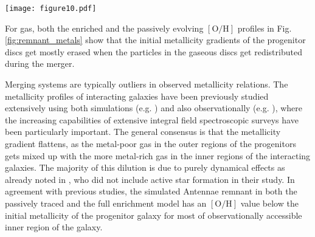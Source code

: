 \documentclass[a4paper,fleqn,usenatbib]{mnras}
\begin{document}
\begin{figure*}
\texttt{[image: figure10.pdf]}
    \caption{Gaseous (left) and stellar (right) oxygen abundance of the $1$ Gyr old remnant (black) compared to the
    passively evolved metallicity obtained from the initial conditions (dashed blue, see text for details) and
    the initial abundance of the NGC 4038 progenitor (red). The observed solar 
    abundances are also shown for reference.}
    \label{fig:remnant_metals}
\end{figure*}


For gas, both the enriched and the passively evolving $[\mathrm{O}/\mathrm{H}]$ profiles in Fig. \ref{fig:remnant_metals} show that 
the initial metallicity gradients of the progenitor discs 
get mostly erased when the particles in the gaseous discs get redistributed during the 
merger. 

Merging systems are typically outliers in observed metallicity relations.
The metallicity profiles of interacting galaxies have been previously studied extensively using both simulations (e.g. 
\citealt{2006A&A...459..361P, 2010ApJ...710L.156R, 2010A&A...518A..56M}) and also observationally 
(e.g. \citealt{2008ApJ...674..172R, 2008AJ....135.1877E, 2010ApJ...721L..48K, 2014A&A...563A..49S}), where the 
increasing capabilities of extensive integral field spectroscopic surveys have been particularly important. 
The general consensus is that the metallicity gradient flattens, as the metal-poor gas in the outer 
regions of the progenitors gets mixed up with the more metal-rich gas in the inner regions of the interacting galaxies. 
The majority of this dilution is due to purely dynamical effects as already noted in \citet{2010ApJ...710L.156R}, who did not 
include active star formation in their study. In agreement with previous studies, the simulated Antennae remnant 
in both the passively traced and the full enrichment model has an $[\mathrm{O}/\mathrm{H}]$ value below the initial metallicity 
of the progenitor galaxy for most of observationally accessible inner region of the galaxy.
\end{document}
